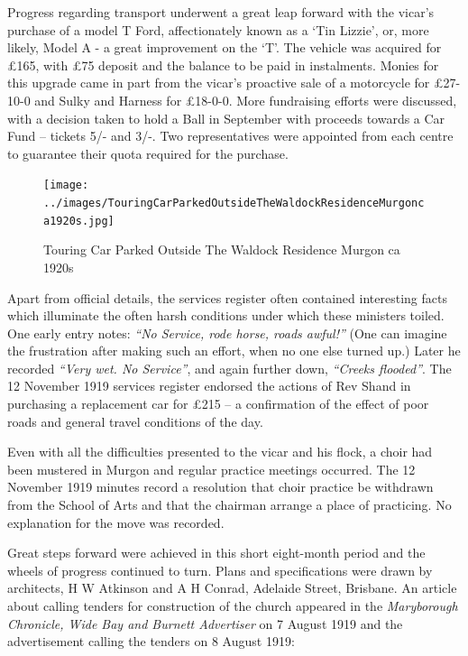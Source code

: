 \smallskip


Progress regarding transport underwent a great leap forward with the vicar's purchase of a model T Ford, affectionately known as a `Tin Lizzie', or, more likely, Model A - a great improvement on the `T'. The vehicle was acquired for \pounds165, with \pounds75 deposit and the balance to be paid in instalments. Monies for this upgrade came in part from the vicar's proactive sale of a motorcycle for \pounds27-10-0 and Sulky and Harness for \pounds18-0-0. More fundraising efforts were discussed, with a decision taken to hold a Ball in September with proceeds towards a Car Fund -- tickets 5/- and 3/-. Two representatives were appointed from each centre to guarantee their quota required for the purchase.









\begin{figure}[!htb]
\begin{center}
\texttt{[image: ../images/TouringCarParkedOutsideTheWaldockResidenceMurgonca1920s.jpg]}
\caption{Touring Car Parked Outside The Waldock Residence Murgon ca 1920s}
\end{center}
\end{figure}




Apart from official details, the services register often contained interesting facts which illuminate the often harsh conditions under which these ministers toiled. One early entry notes: \emph{``No Service, rode horse, roads awful!''} (One can imagine the frustration after making such an effort, when no one else turned up.) Later he recorded \emph{``Very wet. No Service''}, and again further down, \emph{``Creeks flooded''}. The 12 November 1919 services register endorsed the actions of Rev Shand in purchasing a replacement car for \pounds215 -- a confirmation of the effect of poor roads and general travel conditions of the day.



Even with all the difficulties presented to the vicar and his flock, a choir had been mustered in Murgon and regular practice meetings occurred. The 12 November 1919 minutes record a resolution that choir practice be withdrawn from the School of Arts and that the chairman arrange a place of practicing. No explanation for the move was recorded.



Great steps forward were achieved in this short eight-month period and the wheels of progress continued to turn. Plans and specifications were drawn by architects, H W Atkinson and A H Conrad, Adelaide Street, Brisbane. An article about calling tenders for construction of the church appeared in the \emph{Maryborough Chronicle, Wide Bay and Burnett Advertiser} on 7 August 1919 and the advertisement calling the tenders on 8 August 1919:









